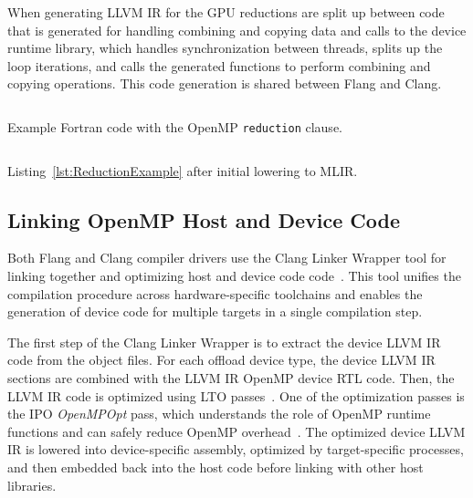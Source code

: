 \documentclass[acmtog,natbib=false]{acmart}
\newcommand{\code}[1]{\texttt{#1}\xspace}
\begin{document}
When generating LLVM \ac{IR} for the GPU reductions are split up between code that is generated for handling combining and copying data and calls to the device runtime library, which handles synchronization between threads, splits up the loop iterations, and calls the generated functions to perform combining and copying operations. This code generation is shared between Flang and Clang.

\begin{listing}[t]
\inputminted{Fortran}{code/tgt_reduction.f90}
\caption{Example Fortran code with the OpenMP \code{reduction} clause.}
\label{lst:ReductionExample}
\end{listing}

\begin{listing}[t]
\inputminted{MLIR-lexer.py:MlirLexer -x}{code/tgt_reduction_abridged.fir}
\caption{Listing~\ref{lst:ReductionExample} after initial lowering to \ac{MLIR}.}
\label{lst:MLIRReductionExample}
\end{listing}

\subsection{Linking OpenMP Host and Device Code}
\label{sec:LinkingOpenMPHostandDeviceCode}
Both Flang and Clang compiler drivers use the Clang Linker Wrapper tool for linking together and optimizing host and device code code~\cite{LLVM25}.
This tool unifies the compilation procedure across hardware-specific toolchains and enables the generation of device code for multiple targets in a single compilation step.

The first step of the Clang Linker Wrapper is to extract the device LLVM IR code from the object files.
For each offload device type, the device LLVM \ac{IR} sections are combined with the LLVM \ac{IR} OpenMP device \ac{RTL} code.
Then, the LLVM \ac{IR} code is optimized using \ac{LTO} passes~\cite{clangLinkerWrapper}.
One of the optimization passes is the \ac{IPO} \textit{OpenMPOpt} pass, which understands the role of OpenMP runtime functions and can safely reduce OpenMP overhead~\cite{OpenMPOpt}.
The optimized device LLVM \ac{IR} is lowered into device-specific assembly, optimized by target-specific processes, and then embedded back into the host code before linking with other host libraries.

\end{document}
